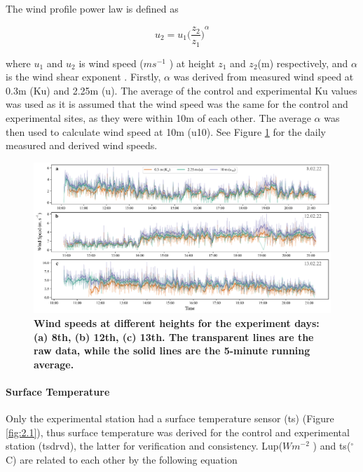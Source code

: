 \documentclass[final,3p,times,authoryear]{elsarticle}
\begin{document}
The wind profile power law is defined as

\begin{equation}
u_{2} = u_{1}  { \bigg( \frac{ z_{2} }{ z_{1} } \bigg) } ^{\alpha}
\label{eq:7.4}
\end{equation}


where $u_{1}$ and $u_{2}$ is wind speed ($ms^{-1}$ ) at height $z_{1}$ and $z_{2}$(m) respectively, and $\alpha$ is the wind shear exponent \citep{Manwell2010}. Firstly, $\alpha$ was derived from measured wind speed at 0.3m (\gls{Ku}) and 2.25m (\gls{u}). The average of the control and experimental \gls{Ku} values was used as it is assumed that the wind speed was the same for the control and experimental sites, as they were within 10m of each other. The average $\alpha$ was then used to calculate wind speed at 10m (\gls{u10}). See Figure \ref{fig:7.7} for the daily measured and derived wind speeds.

\begin{figure}
\centering
\includegraphics[trim={0 0 0 0},clip,scale=1.0]{pict024.png}
\caption{\bf Wind speeds at different heights for the experiment days: (a) 8th, (b) 12th, (c) 13th. The transparent lines are the raw data, while the solid lines are the 5-minute running average.}
 \label{fig:7.7}
\end{figure}



\paragraph{Surface Temperature}\label{sec:appendix7.4.2}

Only the experimental station had a surface temperature sensor (\gls{ts}) (Figure \ref{fig:2.1}), thus surface temperature was derived for the control and experimental station (\gls{tsdrvd}), the latter for verification and consistency. \gls{Lup}($Wm^{-2}$ ) and \gls{ts}($^{\circ}$C) are related to each other by the following equation
\end{document}
